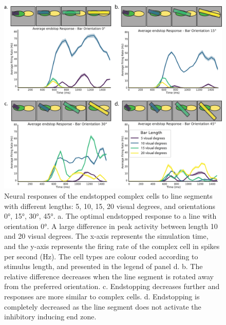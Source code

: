 \documentclass[12pt]{article}
\begin{document}
\begin{figure}[H]
    \centering
    \includegraphics[width=1.0 \textwidth]{./adjusted_figures/LIF_endstopping_length_orientation.png}
    \caption{Neural responses of the endstopped complex cells to line segments with different lengths: 5, 10, 15, 20 visual degrees, and orientations 0°, 15°, 30°, 45°. a. The optimal endstopped response to a line with orientation 0°. A large difference in peak activity between length 10 and 20 visual degrees. The x-axis represents the simulation time, and the y-axis represents the firing rate of the complex cell in spikes per second (Hz). The cell types are colour coded according to stimulus length, and presented in the legend of panel d. b. The relative difference decreases when the line segment is rotated away from the preferred orientation. c. Endstopping decreases further and responses are more similar to complex cells. d. Endstopping is completely decreased as the line segment does not activate the inhibitory inducing end zone.}
    \label{fig:endstopping}
\end{figure}
\end{document}
